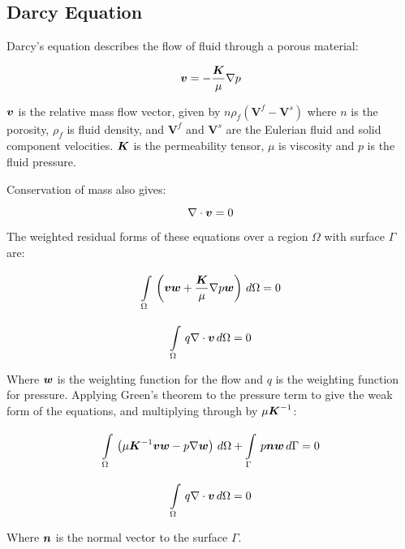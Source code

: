 \subsection{Darcy Equation}

Darcy's equation describes the flow of fluid through a porous material:

\begin{equation}
\vect{v} = -\frac{\tensor{K}}{\mu} \gradient p
\end{equation}

$\vect{v}$ is the relative mass flow vector, given by $n \rho_f (\boldsymbol{V}^f - \boldsymbol{V}^s)$ where
$n$ is the porosity, $\rho_f$ is fluid density, and $\boldsymbol{V}^f$ and $\boldsymbol{V}^s$ are the
Eulerian fluid and solid component velocities.
$\boldsymbol{K}$ is the permeability tensor, $\mu$ is viscosity
and $p$ is the fluid pressure.

Conservation of mass also gives:

\begin{equation}
\gradient \cdot \vect{v} = 0
\end{equation}

The weighted residual forms of these equations over a region $\Omega$ with surface $\Gamma$ are:

\begin{equation}
\gint{\Omega}{}{\left(\vect{v} \vect{w} + \frac{\tensor{K}}{\mu} \gradient p \vect{w}\right)}{\Omega} = 0
\end{equation}

\begin{equation}
\gint{\Omega}{}{q \gradient \cdot \vect{v}}{\Omega} = 0
\end{equation}

Where $\vect{w}$ is the weighting function for the flow and $q$ is the weighting function
for pressure.
Applying Green's theorem to the pressure term to give the weak form of the equations, and multiplying through by
$\mu \boldsymbol{K}^{-1}$:

\begin{equation}
  \gint{\Omega}{}{\left(\mu \tensor{K}^{-1} \vect{v} \vect{w} - p \gradient \vect{w}\right)}{\Omega}  + %
  \gint{\Gamma}{}{p \vect{n} \vect{w}}{\Gamma}= 0
\end{equation}

\begin{equation}
  \gint{\Omega}{}{q \gradient \cdot \vect{v}}{\Omega}= 0
\end{equation}

Where $\vect{n}$ is the normal vector to the surface $\Gamma$.

